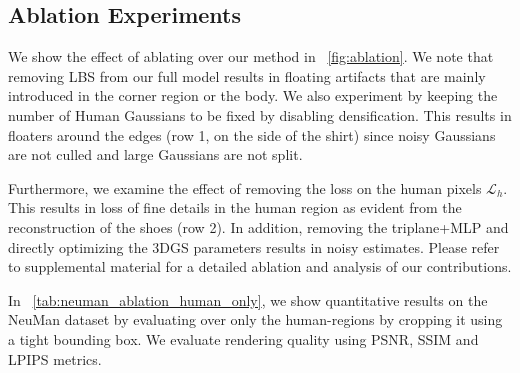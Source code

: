 \subsection{Ablation Experiments}
% 


We show the effect of ablating over our method in ~\cref{fig:ablation}. We note that removing LBS from our full model results in floating artifacts that are mainly introduced in the corner region or the body. We also experiment by keeping the number of Human Gaussians to be fixed by disabling densification. This results in floaters around the edges (row 1, on the side of the shirt) since noisy Gaussians are not culled and large Gaussians are not split. 

Furthermore, we examine the effect of removing the loss on the human pixels $\mathcal{L}_h$. This results in loss of fine details in the human region as evident from the reconstruction of the shoes (row 2). In addition, removing the triplane+MLP and directly optimizing the 3DGS parameters results in noisy estimates. Please refer to supplemental material for a detailed ablation and analysis of our contributions.

In ~\cref{tab:neuman_ablation_human_only}, we show quantitative results on the NeuMan dataset by evaluating over only the human-regions by cropping it using a tight bounding box. We evaluate rendering quality using PSNR, SSIM and LPIPS metrics.




